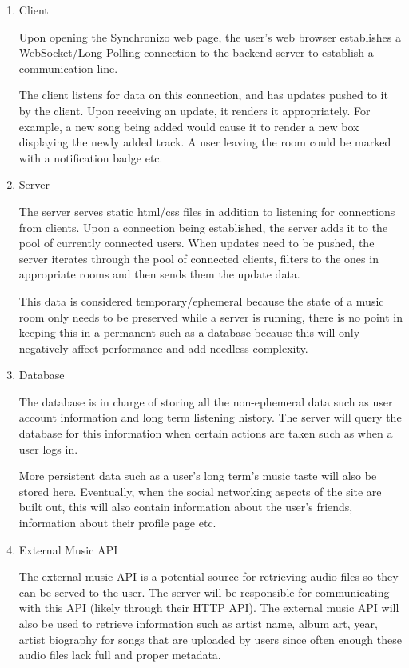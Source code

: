 \documentclass[12pt]{report}
\begin{document}
\begin{enumerate}
    \item Client
    
        Upon opening the Synchronizo web page, the user's web browser establishes a WebSocket/Long Polling connection to the backend server to establish a communication line.
        
        The client listens for data on this connection, and has updates pushed to it by the client. Upon receiving an update, it renders it appropriately. For example, a new song being added would cause it to render a new box displaying the newly added track. A user leaving the room could be marked with a notification badge etc.
    
    \item Server
    
        The server serves static html/css files in addition to listening for connections from clients. Upon a connection being established, the server adds it to the pool of currently connected users. When updates need to be pushed, the server iterates through the pool of connected clients, filters to the ones in appropriate rooms and then sends them the update data.
        
        This data is considered temporary/ephemeral because the state of a music room only needs to be preserved while a server is running, there is no point in keeping this in a permanent such as a database because this will only negatively affect performance and add needless complexity.
        
    \item Database
    
        The database is in charge of storing all the non-ephemeral data such as user account information and long term listening history. The server will query the database for this information when certain actions are taken such as when a user logs in.
        
        More persistent data such as a user's long term's music taste will also be stored here. Eventually, when the social networking aspects of the site are built out, this will also contain information about the user's friends, information about their profile page etc.
    
    \item External Music API
        
        The external music API is a potential source for retrieving audio files so they can be served to the user. The server will be responsible for communicating with this API (likely through their HTTP API). The external music API will also be used to retrieve information such as artist name, album art, year, artist biography for songs that are uploaded by users since often enough these audio files lack full and proper metadata.
    
\end{enumerate}
\end{document}

